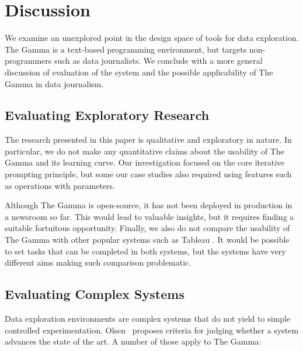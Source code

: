\documentclass[manuscript,review,anonymous]{acmart}
\begin{document}
\section{Discussion}
We examine an unexplored point in the design space of tools for data exploration. The Gamma is a
text-based programming environment, but targets non-programmers such as data journalists. We
conclude with a more general discussion of evaluation of the system and the possible applicability
of The Gamma in data journalism.

\subsection{Evaluating Exploratory Research}
The research presented in this paper is qualitative and exploratory in nature. In particular,
we do not make any quantitative claims about the usability of The Gamma and its learning curve.
Our investigation focused on the core iterative prompting principle, but some our case studies
also required using features such as operations with parameters.

Although The Gamma is open-source, it has not been deployed in production in a newsroom so far.
This would lead to valuable insights, but it requires finding a suitable fortuitous opportunity.
Finally, we also do not compare the usability of The Gamma with other popular systems
such as Tableau \cite{tableau}. It would be possible to set tasks that can be completed
in both systems, but the systems have very different aims making such comparison problematic.

\subsection{Evaluating Complex Systems}
\label{sec:discussion-eval}
Data exploration environments are complex systems that do not yield to simple controlled
experimentation. Olsen~\cite{evaluating} proposes criteria for judging whether a system advances
the state of the art. A number of those apply to The Gamma:
\end{document}
